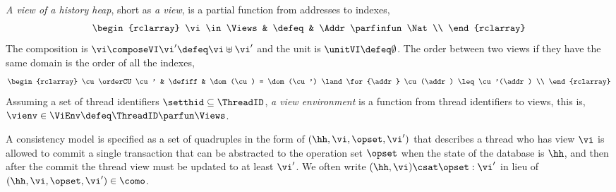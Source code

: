 \begin{defn}[Views]
\label{def:cuts}
\label{def:views}
\emph{A view of a history heap}, short as \emph{a view}, is a partial function from addresses to indexes,
\[
\begin{rclarray}
    \vi \in \Views & \defeq & \Addr \parfinfun \Nat \\
\end{rclarray}
\]                                                                     
The composition is \( \vi \composeVI \vi' \defeq \vi \uplus \vi'\) and the unit is \( \unitVI \defeq \emptyset\).
The order between two views if they have the same domain is the order of all the indexes, 
\[
\begin{rclarray}
    \cu \orderCU \cu' & \defiff & \dom(\cu) = \dom(\cu') \land \for{\addr} \cu(\addr) \leq \cu'(\addr) \\
\end{rclarray}
\]
Assuming a set of thread identifiers \( \setthid \subseteq \ThreadID \), \emph{a view environment} is a function from thread identifiers to views, this is, \( \vienv \in \ViEnv \defeq \ThreadID \parfun \Views \).
\end{defn}

A consistency model is specified as a set of quadruples in the form of \( ( \hh, \vi, \opset, \vi' ) \) that describes a thread who has view \( \vi \) is allowed to commit a single transaction that can be abstracted to the operation set \( \opset \) when the state of the database is \( \hh \), and then after the commit the thread view must be updated to at least \( \vi' \).
We often write \( (\hh, \vi) \csat \opset : \vi' \) in lieu of \( (\hh, \vi, \opset, \vi') \in \como \).



